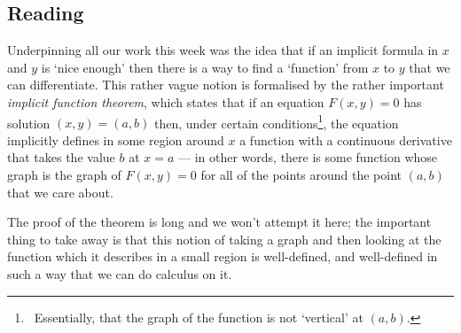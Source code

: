 


\subsection*{Reading}
Underpinning all our work this week was the idea that if an implicit formula in $ x $ and $ y $ is `nice enough' then there is a way to
find a `function' from $ x $ to $ y $ that we can differentiate. This rather vague notion is formalised by the rather important \emph{implicit
function theorem}, which states that if an equation $ F(x,y) = 0 $ has solution $ (x,y) = (a,b) $ then, under certain conditions\footnote{~Essentially,
that the graph of the function is not `vertical' at $ (a,b) $.}, the equation implicitly defines in some region around $ x $ a function with
a continuous derivative that takes the value $ b $ at $ x = a $ --- in other words, there is some function whose graph is the graph of $ F(x,y) = 0 $
for all of the points around the point $ (a,b) $ that we care about.

The proof of the theorem is long and we won't attempt it here; the important thing to take away is that this notion of taking a graph and then
looking at the function which it describes in a small region is well-defined, and well-defined in such a way that we can do calculus on it.

